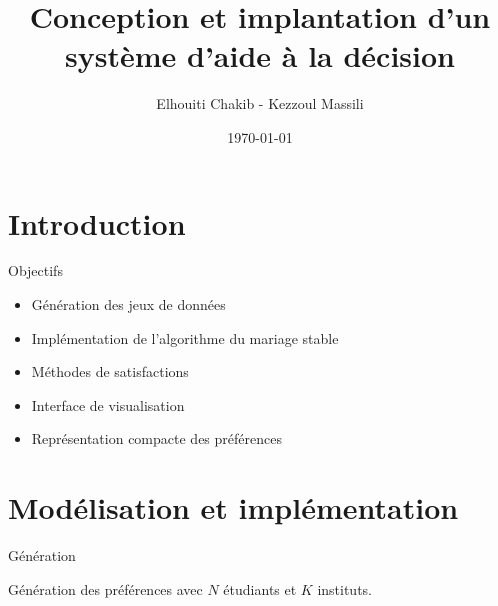\documentclass[10pt,handout]{beamer}
\title[Mariage stable]{Conception et implantation d'un système d'aide à la décision}
\author[Elhouiti, Kezzoul]{Elhouiti Chakib - Kezzoul Massili }
\institute[]{Université de Montpellier}
\date{\today}
\newif\ifplacelogo %
\begin{document}
\placelogofalse
\begin{frame}
	\titlepage
\end{frame}

\placelogotrue

\section{Introduction}

\begin{frame}{Objectifs}
    \begin{block}{}
        \begin{itemize}
            \item Génération des jeux de données
            \item Implémentation de l'algorithme du mariage stable
            \item Méthodes de satisfactions
            \item Interface de visualisation
            \item Représentation compacte des préférences
        \end{itemize}
    \end{block}
\end{frame}

\section{Modélisation et implémentation}

\placelogofalse
\begin{frame}{Génération}
    \begin{block}{}
        Génération des préférences avec $N$ étudiants et $K$ instituts.
    \end{block}
    
\end{frame}
\end{document}
